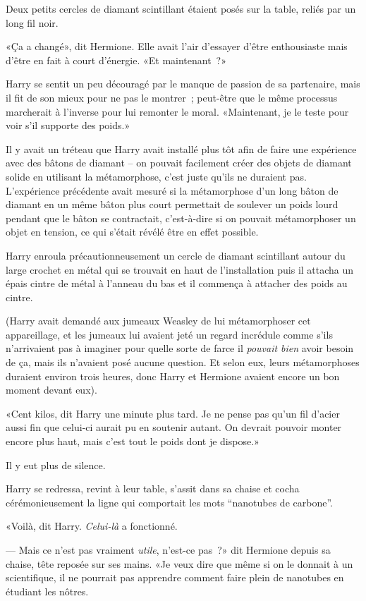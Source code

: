Deux petits cercles de diamant scintillant étaient posés sur la table, reliés par un long fil noir.

«Ça a changé», dit Hermione. Elle avait l'air d'essayer d'être enthousiaste mais d'être en fait à court d'énergie. «Et maintenant~?»

Harry se sentit un peu découragé par le manque de passion de sa partenaire, mais il fit de son mieux pour ne pas le montrer~; peut-être que le même processus marcherait à l'inverse pour lui remonter le moral. «Maintenant, je le teste pour voir s'il supporte des poids.»

Il y avait un tréteau que Harry avait installé plus tôt afin de faire une expérience avec des bâtons de diamant -- on pouvait facilement créer des objets de diamant solide en utilisant la métamorphose, c'est juste qu'ils ne duraient pas. L'expérience précédente avait mesuré si la métamorphose d'un long bâton de diamant en un même bâton plus court permettait de soulever un poids lourd pendant que le bâton se contractait, c'est-à-dire si on pouvait métamorphoser un objet en tension, ce qui s'était révélé être en effet possible.

Harry enroula précautionneusement un cercle de diamant scintillant autour du large crochet en métal qui se trouvait en haut de l'installation puis il attacha un épais cintre de métal à l'anneau du bas et il commença à attacher des poids au cintre.

(Harry avait demandé aux jumeaux Weasley de lui métamorphoser cet appareillage, et les jumeaux lui avaient jeté un regard incrédule comme s'ils n'arrivaient pas à imaginer pour quelle sorte de farce il \emph{pouvait bien} avoir besoin de ça, mais ils n'avaient posé aucune question. Et selon eux, leurs métamorphoses duraient environ trois heures, donc Harry et Hermione avaient encore un bon moment devant eux).

«Cent kilos, dit Harry une minute plus tard. Je ne pense pas qu'un fil d'acier aussi fin que celui-ci aurait pu en soutenir autant. On devrait pouvoir monter encore plus haut, mais c'est tout le poids dont je dispose.»

Il y eut plus de silence.

Harry se redressa, revint à leur table, s'assit dans sa chaise et cocha cérémonieusement la ligne qui comportait les mots “nanotubes de carbone”.

«Voilà, dit Harry. \emph{Celui-là} a fonctionné.

--- Mais ce n'est pas vraiment \emph{utile}, n'est-ce pas~?» dit Hermione depuis sa chaise, tête reposée sur ses mains. «Je veux dire que même si on le donnait à un scientifique, il ne pourrait pas apprendre comment faire plein de nanotubes en étudiant les nôtres.


